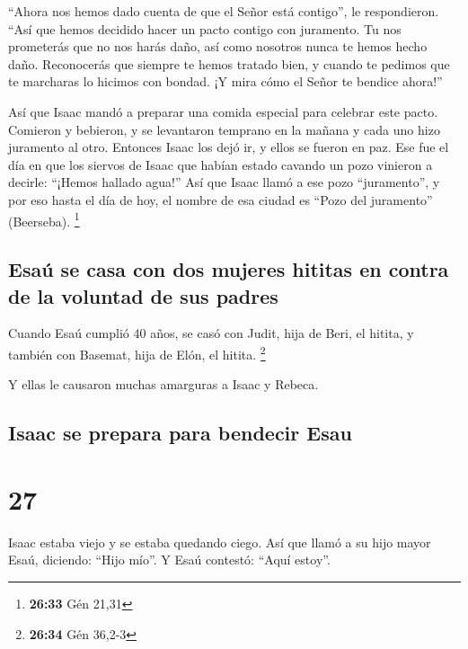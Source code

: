  ``Ahora nos hemos dado cuenta de que el Señor está
contigo'', le respondieron. ``Así que hemos decidido hacer un pacto
contigo con juramento.  Tu nos prometerás que no nos
harás daño, así como nosotros nunca te hemos hecho daño. Reconocerás que
siempre te hemos tratado bien, y cuando te pedimos que te marcharas lo
hicimos con bondad. ¡Y mira cómo el Señor te bendice ahora!''

 Así que Isaac mandó a preparar una comida especial para
celebrar este pacto. Comieron y bebieron,  y se
levantaron temprano en la mañana y cada uno hizo juramento al otro.
Entonces Isaac los dejó ir, y ellos se fueron en paz. 
Ese fue el día en que los siervos de Isaac que habían estado cavando un
pozo vinieron a decirle: ``¡Hemos hallado agua!''  Así
que Isaac llamó a ese pozo ``juramento'', y por eso hasta el día de hoy,
el nombre de esa ciudad es ``Pozo del juramento'' (Beerseba).
\footnote{\textbf{26:33} Gén 21,31}

\hypertarget{esauxfa-se-casa-con-dos-mujeres-hititas-en-contra-de-la-voluntad-de-sus-padres}{%
\subsection{Esaú se casa con dos mujeres hititas en contra de la
voluntad de sus
padres}\label{esauxfa-se-casa-con-dos-mujeres-hititas-en-contra-de-la-voluntad-de-sus-padres}}

 Cuando Esaú cumplió 40 años, se casó con Judit, hija de
Beri, el hitita, y también con Basemat, hija de Elón, el hitita.
\footnote{\textbf{26:34} Gén 36,2-3}

 Y ellas le causaron muchas amarguras a Isaac y Rebeca.

\hypertarget{isaac-se-prepara-para-bendecir-esau}{%
\subsection{Isaac se prepara para bendecir
Esau}\label{isaac-se-prepara-para-bendecir-esau}}

\hypertarget{section-26}{%
\section{27}\label{section-26}}

 Isaac estaba viejo y se estaba quedando ciego. Así que
llamó a su hijo mayor Esaú, diciendo: ``Hijo mío''. Y Esaú contestó:
``Aquí estoy''.

